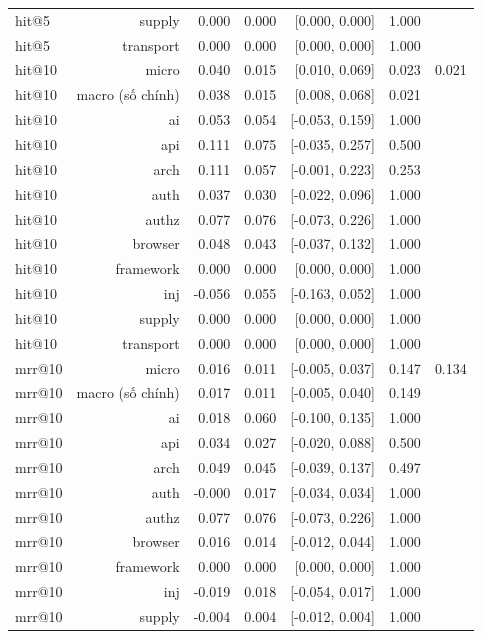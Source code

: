 \begin{table}[ht]
\begin{tabular}{lrrrrrr}
hit@5 & supply & 0.000 & 0.000 & [0.000, 0.000] & 1.000 &  \\
hit@5 & transport & 0.000 & 0.000 & [0.000, 0.000] & 1.000 &  \\
hit@10 & micro & 0.040 & 0.015 & [0.010, 0.069] & 0.023 & 0.021 \\
hit@10 & macro (số chính) & 0.038 & 0.015 & [0.008, 0.068] & 0.021 &  \\
hit@10 & ai & 0.053 & 0.054 & [-0.053, 0.159] & 1.000 &  \\
hit@10 & api & 0.111 & 0.075 & [-0.035, 0.257] & 0.500 &  \\
hit@10 & arch & 0.111 & 0.057 & [-0.001, 0.223] & 0.253 &  \\
hit@10 & auth & 0.037 & 0.030 & [-0.022, 0.096] & 1.000 &  \\
hit@10 & authz & 0.077 & 0.076 & [-0.073, 0.226] & 1.000 &  \\
hit@10 & browser & 0.048 & 0.043 & [-0.037, 0.132] & 1.000 &  \\
hit@10 & framework & 0.000 & 0.000 & [0.000, 0.000] & 1.000 &  \\
hit@10 & inj & -0.056 & 0.055 & [-0.163, 0.052] & 1.000 &  \\
hit@10 & supply & 0.000 & 0.000 & [0.000, 0.000] & 1.000 &  \\
hit@10 & transport & 0.000 & 0.000 & [0.000, 0.000] & 1.000 &  \\
mrr@10 & micro & 0.016 & 0.011 & [-0.005, 0.037] & 0.147 & 0.134 \\
mrr@10 & macro (số chính) & 0.017 & 0.011 & [-0.005, 0.040] & 0.149 &  \\
mrr@10 & ai & 0.018 & 0.060 & [-0.100, 0.135] & 1.000 &  \\
mrr@10 & api & 0.034 & 0.027 & [-0.020, 0.088] & 0.500 &  \\
mrr@10 & arch & 0.049 & 0.045 & [-0.039, 0.137] & 0.497 &  \\
mrr@10 & auth & -0.000 & 0.017 & [-0.034, 0.034] & 1.000 &  \\
mrr@10 & authz & 0.077 & 0.076 & [-0.073, 0.226] & 1.000 &  \\
mrr@10 & browser & 0.016 & 0.014 & [-0.012, 0.044] & 1.000 &  \\
mrr@10 & framework & 0.000 & 0.000 & [0.000, 0.000] & 1.000 &  \\
mrr@10 & inj & -0.019 & 0.018 & [-0.054, 0.017] & 1.000 &  \\
mrr@10 & supply & -0.004 & 0.004 & [-0.012, 0.004] & 1.000 &  \\

\end{tabular}
\end{table}
